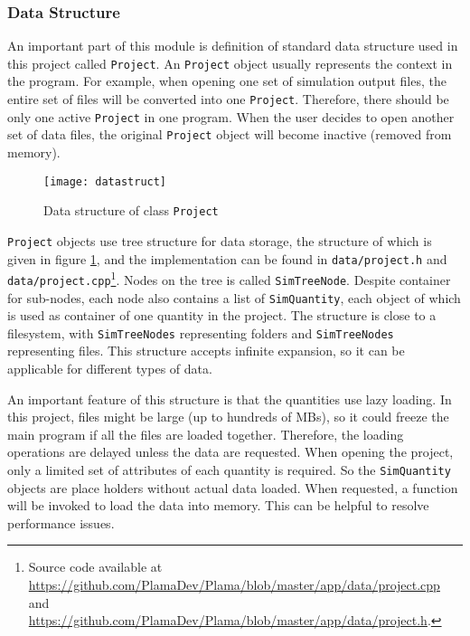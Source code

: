 \subsubsection{Data Structure} \label{sec:datastruct}

An important part of this module is definition of standard data structure used in this project called \texttt{Project}. An \texttt{Project} object usually represents the context in the program. For example, when opening one set of simulation output files, the entire set of files will be converted into one \texttt{Project}. Therefore, there should be only one active \texttt{Project} in one program. When the user decides to open another set of data files, the original \texttt{Project} object will become inactive (removed from memory).

\begin{figure}[!htb]
	\centering
	\texttt{[image: datastruct]}
	\caption{Data structure of class \texttt{Project}}
	\label{fig:datastruct}
\end{figure}


\texttt{Project} objects use tree structure for data storage, the structure of which is given in figure \ref{fig:datastruct}, and the implementation can be found in \texttt{data/project.h} and \texttt{data/project.cpp}\footnote{\label{ftnt:project}Source code available at \url{https://github.com/PlamaDev/Plama/blob/master/app/data/project.cpp} and \url{https://github.com/PlamaDev/Plama/blob/master/app/data/project.h}.}. Nodes on the tree is called \texttt{SimTreeNode}. Despite container for sub-nodes, each node also contains a list of \texttt{SimQuantity}, each object of which is used as container of one quantity in the project. The structure is close to a filesystem, with \texttt{SimTreeNodes} representing folders and \texttt{SimTreeNodes} representing files. This structure accepts infinite expansion, so it can be applicable for different types of data.

An important feature of this structure is that the quantities use lazy loading. In this project, files might be large (up to hundreds of MBs), so it could freeze the main program if all the files are loaded together. Therefore, the loading operations are delayed unless the data are requested. When opening the project, only a limited set of attributes of each quantity is required. So the \texttt{SimQuantity} objects are place holders without actual data loaded. When requested, a function will be invoked to load the data into memory. This can be helpful to resolve performance issues.

